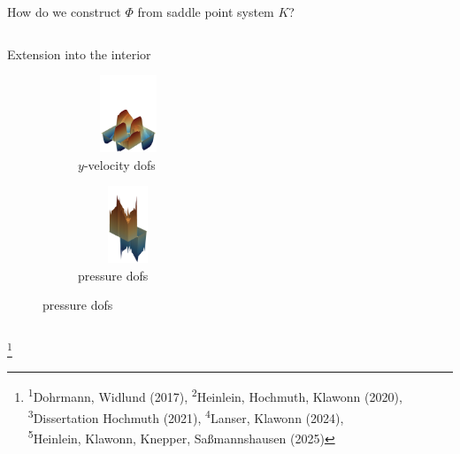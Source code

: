 \begin{frame}{How do we construct $\varPhi$ from saddle point system $K$?}
\begin{columns}
\begin{column}{0.52\textwidth}
{\begin{block}{\normalsize Extension into the interior}
\begin{figure}
						\vfill
						\hspace*{-12mm}
						\begin{subfigure}{0.29\textwidth}
							\centering
                            \vspace*{-3mm}
							\includegraphics[width=3cm,height=23mm]{images/RGDSW-y-cut.png}
							\vspace*{-5mm}
							\caption{$y$-velocity dofs}
						\end{subfigure}
						\hspace{12mm}
						\begin{subfigure}{0.29\textwidth}
							\centering
                            \vspace*{-3mm}
							\includegraphics[width=3cm,height=23mm]{images/RGDSW-p-cut.png}
							\vspace*{-5mm}
							\caption{pressure dofs}
						\end{subfigure}
					\end{figure}
					\vspace{-4mm}
				\end{block}
			}
		\end{column}
	\end{columns}
	{\let\thefootnote\relax\footnote{{\tiny \!\!\!\!\textsuperscript{1}Dohrmann, Widlund (2017), \textsuperscript{2}Heinlein, Hochmuth, Klawonn (2020),  \textsuperscript{3}Dissertation Hochmuth (2021),  \textsuperscript{4}Lanser, Klawonn (2024),\\\hspace{3em}\!\!\!\!\!\!\textsuperscript{5}Heinlein, Klawonn, Knepper, Saßmannshausen (2025)}}}
\end{frame}


